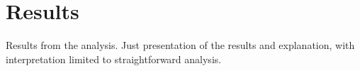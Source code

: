 \section*{Results}

Results from the analysis. Just presentation of the results and explanation,
with interpretation limited to straightforward analysis.